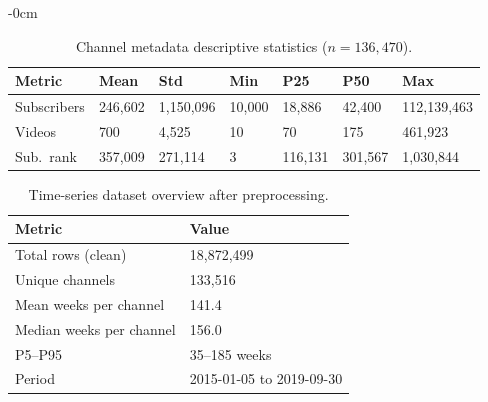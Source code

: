 \documentclass[journal,article,submit,pdftex,moreauthors]{Definitions/mdpi}
\begin{document}
\begin{adjustwidth}{-\extralength}{0cm}
\begin{table}[H]
\caption{Channel metadata descriptive statistics
($n = 136{,}470$).\label{tab:channels}}
\begin{tabularx}{\textwidth}{lllllll}
\toprule
\textbf{Metric}&\textbf{Mean}&\textbf{Std}&\textbf{Min}&
\textbf{P25}&\textbf{P50}&\textbf{Max}\\
\midrule
Subscribers & 246,602 & 1,150,096 & 10,000 & 18,886 & 42,400 & 112,139,463 \\
Videos      & 700     & 4,525     & 10     & 70     & 175    & 461,923 \\
Sub.\ rank  & 357,009 & 271,114   & 3      & 116,131& 301,567& 1,030,844 \\
\bottomrule
\end{tabularx}
\end{table}

\begin{table}[H]
\caption{Time-series dataset overview after preprocessing.\label{tab:ts}}
\begin{tabularx}{\textwidth}{ll}
\toprule
\textbf{Metric} & \textbf{Value} \\
\midrule
Total rows (clean)        & 18,872,499 \\
Unique channels           & 133,516 \\
Mean weeks per channel    & 141.4 \\
Median weeks per channel  & 156.0 \\
P5--P95                   & 35--185 weeks \\
Period                    & 2015-01-05 to 2019-09-30 \\
\bottomrule
\end{tabularx}
\end{table}


\end{adjustwidth}
\end{document}
